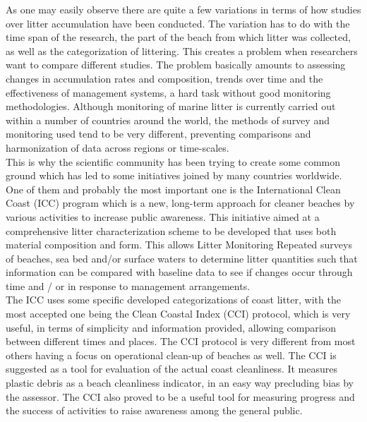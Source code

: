 \documentclass[10pt]{article}\usepackage[]{graphicx}\usepackage[]{color}
\begin{document}
As one may easily observe there are quite a few variations in terms of how studies over litter accumulation have been conducted. The variation has to do with the time span of the research, the part of the beach from which litter was collected, as well as the categorization of littering. This creates a problem when researchers want to compare different studies. The problem basically amounts to assessing changes in accumulation rates and composition, trends over time and the effectiveness of management systems, a hard task without good monitoring methodologies. Although monitoring of marine litter is currently carried out within a number of countries around the world, the methods of survey and monitoring used tend to be very different, preventing comparisons and harmonization of data across regions or time-scales. \\

This is why the scientific community has been trying to create some common ground which has led to some initiatives joined by many countries worldwide. One of them and probably the most important one is the International Clean Coast (ICC) program which is a new, long-term approach for cleaner beaches by various activities to increase public awareness. \cite{ CHESHIRE2009} This initiative aimed at a comprehensive litter characterization scheme to be developed that uses both material composition and form. This allows Litter Monitoring Repeated surveys of beaches, sea bed and/or surface waters to determine litter quantities such that information can be compared with baseline data to see if changes occur through time and / or in response to management arrangements. \\

The ICC uses some specific developed categorizations of coast litter, with the most accepted one being the Clean Coastal Index (CCI) protocol, which is very useful, in terms of simplicity and information provided, allowing comparison between different times and places. The CCI protocol is very different from most others having a focus on operational clean-up of beaches as well. The CCI is suggested as a tool for evaluation of the actual coast cleanliness. It measures plastic debris as a beach cleanliness indicator, in an easy way precluding bias by the assessor. The CCI also proved to be a useful tool for measuring progress and the success of activities to raise awareness among the general public. \cite{ALKALAY2007} \\
\end{document}
